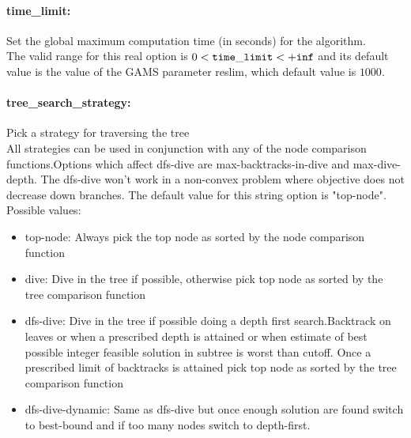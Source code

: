 \paragraph{time\_limit:} Set the global maximum computation time (in seconds) for the algorithm. $\;$ \\
 The valid range for this real option is 
$0 <  {\tt time\_limit } <  {\tt +inf}$
and its default value is the value of the GAMS parameter reslim, which default value is $1000$.


\paragraph{tree\_search\_strategy:} Pick a strategy for traversing the tree $\;$ \\
 All strategies can be used in conjunction with
any of the node comparison functions.Options
which affect dfs-dive are max-backtracks-in-dive
and max-dive-depth. The dfs-dive won't work in a
non-convex problem where objective does not
decrease down branches.
The default value for this string option is "top-node".
\\ 
Possible values:
\begin{itemize}
   \item top-node:  Always pick the top node as sorted by the node
comparison function
   \item dive: Dive in the tree if possible, otherwise pick
top node as sorted by the tree comparison
function
   \item dfs-dive: Dive in the tree if possible doing a depth
first search.Backtrack on leaves or when a
prescribed depth is attained or when estimate
of best possible integer feasible solution in
subtree is worst than cutoff. Once a prescribed
limit of backtracks is attained pick top node
as sorted by the tree comparison function
   \item dfs-dive-dynamic: Same as dfs-dive but once enough solution are
found switch to best-bound and if too many
nodes switch to depth-first.
\end{itemize}

